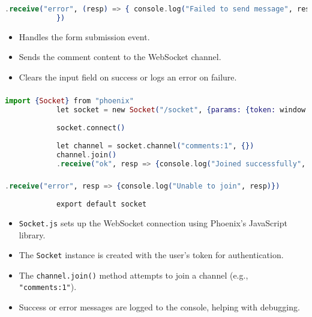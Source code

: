 \documentclass[aspectratio=169, table]{beamer}
\begin{document}
	\begin{frame}[fragile]
		\frametitle{}
		\begin{lstlisting}[language=Elixir]
				.receive("error", (resp) => { console.log("Failed to send message", resp) })
			})
		\end{lstlisting}
		\begin{itemize}
			\item Handles the form submission event.
			\item Sends the comment content to the WebSocket channel.
			\item Clears the input field on success or logs an error on failure.
		\end{itemize}
	\end{frame}
	
	\begin{frame}[fragile]
		\frametitle{}
		\begin{lstlisting}[language=Elixir]
			import {Socket} from "phoenix"
			let socket = new Socket("/socket", {params: {token: window.userToken}})
			
			socket.connect()
			
			let channel = socket.channel("comments:1", {})
			channel.join()
			.receive("ok", resp => {console.log("Joined successfully", resp)})
		\end{lstlisting}
	\end{frame}
	
	\begin{frame}[fragile]
		\frametitle{}
		\begin{lstlisting}[language=Elixir]
			.receive("error", resp => {console.log("Unable to join", resp)})
			
			export default socket
		\end{lstlisting}
		\begin{itemize}
			\item \texttt{Socket.js} sets up the WebSocket connection using Phoenix's JavaScript library.
			\item The \texttt{Socket} instance is created with the user's token for authentication.
			\item The \texttt{channel.join()} method attempts to join a channel (e.g., \texttt{"comments:1"}).
			\item Success or error messages are logged to the console, helping with debugging.
		\end{itemize}
	\end{frame}
	
\end{document}
